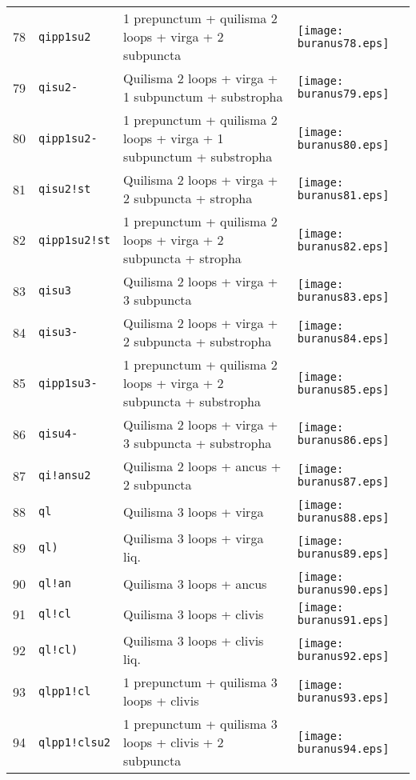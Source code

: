 \documentclass{scrarticle}
\begin{document}
\begin{longtable}{l|l|l|l}
78 & \texttt{qipp1su2} & 1 prepunctum + quilisma 2 loops + virga + 2 subpuncta & \texttt{[image: buranus78.eps]} \\
79 & \texttt{qisu2-} & Quilisma 2 loops + virga + 1 subpunctum + substropha & \texttt{[image: buranus79.eps]} \\
80 & \texttt{qipp1su2-} & 1 prepunctum + quilisma 2 loops + virga + 1 subpunctum + substropha & \texttt{[image: buranus80.eps]} \\
81 & \texttt{qisu2!st} & Quilisma 2 loops + virga + 2 subpuncta + stropha & \texttt{[image: buranus81.eps]} \\
82 & \texttt{qipp1su2!st} & 1 prepunctum + quilisma 2 loops + virga + 2 subpuncta + stropha & \texttt{[image: buranus82.eps]} \\
83 & \texttt{qisu3} & Quilisma 2 loops + virga + 3 subpuncta & \texttt{[image: buranus83.eps]} \\
84 & \texttt{qisu3-} & Quilisma 2 loops + virga + 2 subpuncta + substropha & \texttt{[image: buranus84.eps]} \\
85 & \texttt{qipp1su3-} & 1 prepunctum + quilisma 2 loops + virga + 2 subpuncta + substropha & \texttt{[image: buranus85.eps]} \\
86 & \texttt{qisu4-} & Quilisma 2 loops + virga + 3 subpuncta + substropha & \texttt{[image: buranus86.eps]} \\
87 & \texttt{qi!ansu2} & Quilisma 2 loops + ancus + 2 subpuncta & \texttt{[image: buranus87.eps]} \\
88 & \texttt{ql} & Quilisma 3 loops + virga & \texttt{[image: buranus88.eps]} \\
89 & \texttt{ql)} & Quilisma 3 loops + virga liq. & \texttt{[image: buranus89.eps]} \\
90 & \texttt{ql!an} & Quilisma 3 loops + ancus & \texttt{[image: buranus90.eps]} \\
91 & \texttt{ql!cl} & Quilisma 3 loops + clivis & \texttt{[image: buranus91.eps]} \\
92 & \texttt{ql!cl)} & Quilisma 3 loops + clivis liq. & \texttt{[image: buranus92.eps]} \\
93 & \texttt{qlpp1!cl} & 1 prepunctum + quilisma 3 loops + clivis & \texttt{[image: buranus93.eps]} \\
94 & \texttt{qlpp1!clsu2} & 1 prepunctum + quilisma 3 loops + clivis + 2 subpuncta & \texttt{[image: buranus94.eps]} \\

\end{longtable}
\end{document}
